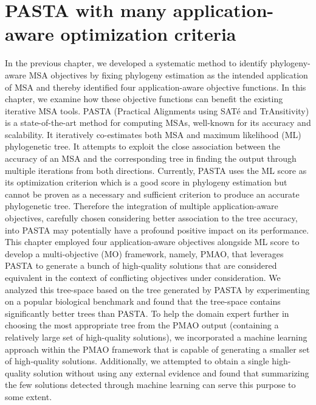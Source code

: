 
\graphicspath{{pmao/Figure/}}
\chapter{PASTA with many application-aware optimization criteria} \label{ch:pmao}
	




In the previous chapter, we developed a systematic method to identify phylogeny-aware MSA objectives by fixing phylogeny estimation as the intended application of MSA and thereby identified four application-aware objective functions. In this chapter, we examine how these objective functions can benefit the existing iterative MSA tools.
PASTA (Practical Alignments using SAT\'e and TrAnsitivity) is a state-of-the-art method for computing MSAs, well-known for its accuracy and scalability. It iteratively co-estimates both MSA and maximum likelihood (ML) phylogenetic tree. It attempts to exploit the close association between the accuracy of an MSA and the corresponding tree in finding the output through multiple iterations from both directions. Currently, PASTA uses the ML score as its optimization criterion which is a good score in phylogeny estimation but cannot be proven as a necessary and sufficient criterion to produce an accurate phylogenetic tree. Therefore the integration of multiple application-aware objectives, carefully chosen considering better association to the tree accuracy, into PASTA may potentially have a profound positive impact on its performance. This chapter employed four application-aware objectives alongside ML score to develop a multi-objective (MO) framework, namely, PMAO, that leverages PASTA to generate a bunch of high-quality solutions that are considered equivalent in the context of conflicting objectives under consideration. We analyzed this tree-space based on the tree generated by PASTA by experimenting on a popular biological benchmark and found that the tree-space contains significantly better trees than PASTA. 
To help the domain expert further in choosing the most appropriate tree from the PMAO output (containing a relatively large set of high-quality solutions), we incorporated a machine learning approach within the PMAO framework that is capable of generating a smaller set of high-quality solutions. Additionally, we attempted to obtain a single high-quality solution without using any external evidence and found that summarizing the few solutions detected through machine learning can serve this purpose to some extent. 

